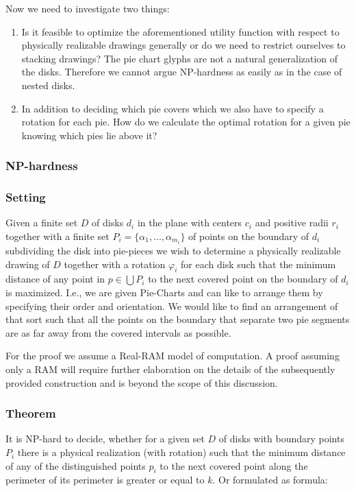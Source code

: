 \documentclass[a4paper,11pt]{article}
\begin{document}
Now we need to investigate two things:

\begin{enumerate}
  \item Is it feasible to optimize the aforementioned utility function with respect to physically realizable drawings generally or do we need to restrict ourselves to stacking drawings? The pie chart glyphs are not a natural generalization of the disks. Therefore we cannot argue NP-hardness as easily as in the case of nested disks.
  \item In addition to deciding which pie covers which we also have to specify a rotation for each pie. How do we calculate the optimal rotation for a given pie knowing which pies lie above it?
\end{enumerate}

\subsubsection{NP-hardness}

\subsubsection*{Setting}
Given a finite set $D$ of disks $d_i$ in the plane with centers $c_i$ and positive radii $r_i$ together with a finite set $P_i = \{ \alpha_1, \dots, \alpha_{m_i}\}$ of points on the boundary of $d_i$ subdividing the disk into pie-pieces we wish to determine a physically realizable drawing of $D$ together with a rotation $\varphi_i$ for each disk such that the minimum distance of any point in $p\in\bigcup P_i$ to the next covered point on the boundary of $d_i$ is maximized.
I.e., we are given Pie-Charts and can like to arrange them by specifying their order and orientation. We would like to find an arrangement of that sort such that all the points on the boundary that separate two pie segments are as far away from the covered intervals as possible.

For the proof we assume a Real-RAM model of computation. A proof assuming only a RAM will require further elaboration on the details of the subsequently provided construction and is beyond the scope of this discussion.

\subsubsection*{Theorem}
It is NP-hard to decide, whether for a given set $D$ of disks with boundary points $P_i$ there is a physical realization (with rotation) such that the minimum distance of any of the distinguished points $p_i$ to the next covered point along the perimeter of its perimeter is greater or equal to $k$. Or formulated as formula:
\end{document}
